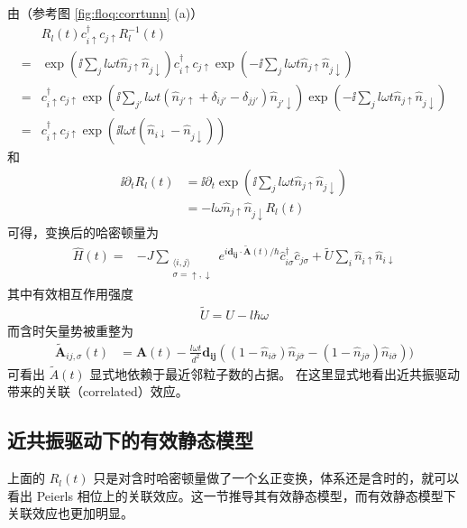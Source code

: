 由（参考图 \ref{fig:floq:corrtunn} (a)）
\begin{align}
& R_l(t)c_{i\uparrow}^{\dagger}c_{j\uparrow}R_l^{-1}(t)\\
=& \exp(\ii\sum_{j}l\omega t\hat{n}_{j\uparrow}\hat{n}_{j\downarrow})
c_{i\uparrow}^{\dagger}c_{j\uparrow}\exp(-\ii\sum_{j}l\omega t\hat{n}_{j\uparrow}\hat{n}_{j\downarrow})\\
=& c_{i\uparrow}^{\dagger}c_{j\uparrow}\exp(\ii\sum_{j'}l\omega t(\hat{n}_{j'\uparrow}+\delta_{ij'}-\delta_{jj'})\hat{n}_{j'\downarrow})\exp(-\ii\sum_{j}l\omega t\hat{n}_{j\uparrow}\hat{n}_{j\downarrow})\\
=& c_{i\uparrow}^{\dagger}c_{j\uparrow} \exp(\ii l\omega t(\hat{n}_{i\downarrow}-\hat{n}_{j\downarrow})) 
\end{align}
和
\begin{align}
\ii\partial_tR_l(t) &= \ii\partial_t \exp(\ii\sum_{j}l\omega t\hat{n}_{j\uparrow}\hat{n}_{j\downarrow}) \\
&= -l \omega \hat{n}_{j\uparrow}\hat{n}_{j\downarrow} R_l(t) 
\end{align}
可得，变换后的哈密顿量为
\begin{align}
\hat{H}(t) =& -J \sum_{\substack{\langle i,j\rangle \\ \sigma = \uparrow,\downarrow}}e^{i\mathbf{d_{ij}}\cdot \tilde{\mathbf{A}}(t)/\hbar} \hat{c}_{i\sigma}^{\dagger}\hat{c}_{j\sigma}+ \tilde{U}\sum_i\hat{n}_{i\uparrow}\hat{n}_{i\downarrow} \label{eq:htt}
\end{align}
其中有效相互作用强度
\begin{align}
\tilde{U}=U-l\hbar\omega
\end{align}
而含时矢量势被重整为
\begin{align}
\tilde{\mathbf{A}}_{ij,\sigma}(t)&=\mathbf{A}(t)-\frac{l\omega t}{d^2} \mathbf{d_{ij}}((1-\hat n_{i\bar\sigma})\hat n_{j\bar\sigma}-(1-\hat n_{j\bar\sigma})\hat n_{i\bar\sigma}))
\end{align}
可看出 $\tilde{A}(t)$ 显式地依赖于最近邻粒子数的占据。
在这里显式地看出近共振驱动带来的关联（correlated）效应。


\subsection{近共振驱动下的有效静态模型}
上面的 $R_l(t)$ 只是对含时哈密顿量做了一个幺正变换，体系还是含时的，就可以看出 Peierls 相位上的关联效应。这一节推导其有效静态模型，而有效静态模型下关联效应也更加明显。


